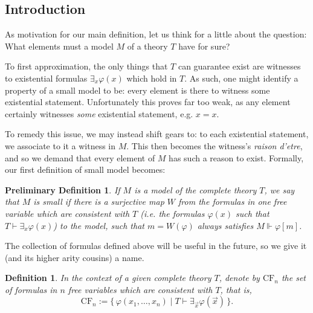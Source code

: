 \documentclass{article}
\newtheorem{prelimdef}[theorem]{Preliminary Definition}
\newtheorem{definition}[theorem]{Definition}
\theoremstyle{nonumberplain}
\newcommand{\CF}{\mathrm{CF}}
\begin{document}
\subsection{Introduction}

As motivation for our main definition, let us think for a little about the question: What elements must a model $M$ of a theory $T$ have for sure?

To first approximation, the only things that $T$ can guarantee exist are witnesses to existential formulas $\exists_x \varphi(x)$ which hold in $T$. As such, one might identify a property of a small model to be: every element is there to witness some existential statement. Unfortunately this proves far too weak, as any element certainly witnesses \emph{some} existential statement, e.g. $x = x$.

To remedy this issue, we may instead shift gears to: to each existential statement, we associate to it a witness in $M$. This then becomes the witness's \textit{raison d'etre}, and so we demand that every element of $M$ has such a reason to exist. Formally, our first definition of small model becomes:
\begin{prelimdef}\label{pd:1}
If $M$ is a model of the complete theory $T$, we say that $M$ is small if there is a \emph{surjective} map $W$ from the formulas in one free variable which are consistent with $T$ (i.e. the formulas $\varphi(x)$ such that $T \vdash \exists_x \varphi(x)$) to the model, such that $m = W(\varphi)$ always satisfies $M \Vdash \varphi[m]$.
\end{prelimdef}

The collection of formulas defined above will be useful in the future, so we give it (and its higher arity cousins) a name.
\begin{definition}
In the context of a given complete theory $T$, denote by $\CF_n$ the set of formulas in $n$ free variables which are consistent with $T$, that is,
\begin{equation}
\CF_n := \{\, \varphi(x_1, \dots, x_n) \mid T \vdash \exists_{\vec x} \varphi(\vec x) \,\}.
\end{equation}
\end{definition}
\end{document}
